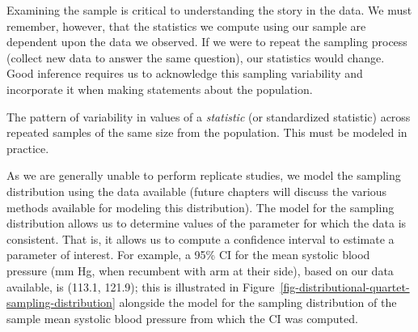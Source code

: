 \documentclass[
  letterpaper,
  DIV=11,
  numbers=noendperiod]{scrreprt}
\theoremstyle{definition}
\theoremstyle{definition}
\theoremstyle{remark}
\begin{document}
Examining the sample is critical to understanding the story in the data.
We must remember, however, that the statistics we compute using our
sample are dependent upon the data we observed. If we were to repeat the
sampling process (collect new data to answer the same question), our
statistics would change. Good inference requires us to acknowledge this
sampling variability and incorporate it when making statements about the
population.

\begin{tcolorbox}[enhanced jigsaw, bottomrule=.15mm, titlerule=0mm, bottomtitle=1mm, colback=white, coltitle=black, rightrule=.15mm, leftrule=.75mm, toprule=.15mm, toptitle=1mm, left=2mm, opacityback=0, colframe=quarto-callout-important-color-frame, breakable, title=\textcolor{quarto-callout-important-color}{\faExclamation}\hspace{0.5em}{Sampling Distribution}, arc=.35mm, colbacktitle=quarto-callout-important-color!10!white, opacitybacktitle=0.6]

The pattern of variability in values of a \emph{statistic} (or
standardized statistic) across repeated samples of the same size from
the population. This must be modeled in practice.

\end{tcolorbox}

As we are generally unable to perform replicate studies, we model the
sampling distribution using the data available (future chapters will
discuss the various methods available for modeling this distribution).
The model for the sampling distribution allows us to determine values of
the parameter for which the data is consistent. That is, it allows us to
compute a confidence interval to estimate a parameter of interest. For
example, a 95\% CI for the mean systolic blood pressure (mm Hg, when
recumbent with arm at their side), based on our data available, is
(113.1, 121.9); this is illustrated in
Figure~\ref{fig-distributional-quartet-sampling-distribution} alongside
the model for the sampling distribution of the sample mean systolic
blood pressure from which the CI was computed.
\end{document}
